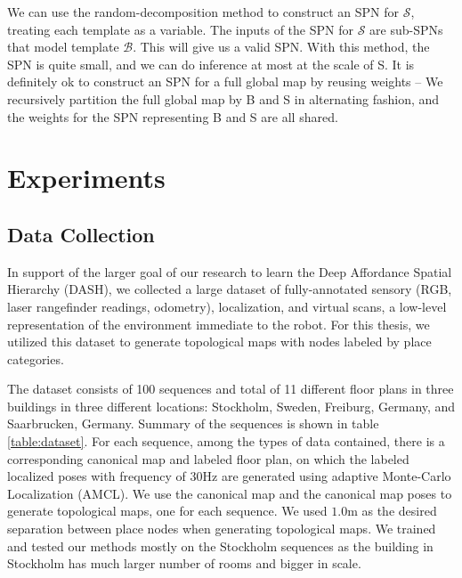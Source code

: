 \documentclass[10pt, titlepage]{article}
\theoremstyle{definition}
\begin{document}
We can use the random-decomposition method to construct an SPN for $\mathcal{S}$, treating each template as a variable. The inputs of the SPN for $\mathcal{S}$ are sub-SPNs that model template $\mathcal{B}$. This will give us a valid SPN. With this method, the SPN is quite small, and we can do inference at most at the scale of S. It is definitely ok to construct an SPN for a full global map by reusing weights -- We recursively partition the full global map by B and S in alternating fashion, and the weights for the SPN representing B and S are all shared.

\newpage
\section{Experiments}\label{section:experiment}
\subsection{Data Collection}\label{section:data}

In support of the larger goal of our research to learn the Deep Affordance Spatial Hierarchy (DASH), we collected a large dataset of fully-annotated sensory (RGB, laser rangefinder readings, odometry), localization, and virtual scans, a low-level representation of the environment immediate to the robot. For this thesis, we utilized this dataset to generate topological maps with nodes labeled by place categories.

The dataset consists of 100 sequences and total of 11 different floor plans in three buildings in three different locations: Stockholm, Sweden, Freiburg, Germany, and Saarbrucken, Germany. Summary of the sequences is shown in table \ref{table:dataset}. For each sequence, among the types of data contained,  there is a corresponding canonical map and labeled floor plan, on which the labeled localized poses with frequency of 30Hz are generated using adaptive Monte-Carlo Localization (AMCL). We use the canonical map and the canonical map poses to generate topological maps, one for each sequence. We used $1.0$m as the desired separation between place nodes when generating topological maps. We trained and tested our methods mostly on the Stockholm sequences as the building in Stockholm has much larger number of rooms and bigger in scale.
\end{document}
